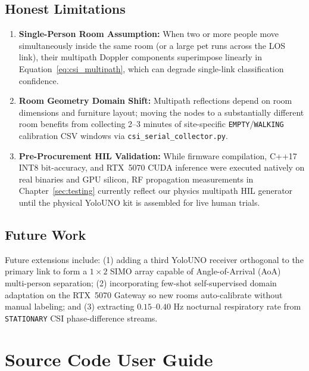 \documentclass{hcmut-report}
\begin{document}
\subsection[Limitations]{Honest Limitations}
\label{sec:limitations}

\begin{enumerate}
  \item \textbf{Single-Person Room Assumption:} When two or more people move simultaneously inside the same room (or a large pet runs across the LOS link), their multipath Doppler components superimpose linearly in Equation~\eqref{eq:csi_multipath}, which can degrade single-link classification confidence.
  \item \textbf{Room Geometry Domain Shift:} Multipath reflections depend on room dimensions and furniture layout; moving the nodes to a substantially different room benefits from collecting 2--3 minutes of site-specific \texttt{EMPTY}/\texttt{WALKING} calibration CSV windows via \texttt{csi\_serial\_collector.py}.
  \item \textbf{Pre-Procurement HIL Validation:} While firmware compilation, C++17 INT8 bit-accuracy, and RTX~5070 CUDA inference were executed natively on real binaries and GPU silicon, RF propagation measurements in Chapter~\ref{sec:testing} currently reflect our physics multipath HIL generator until the physical YoloUNO kit is assembled for live human trials.
\end{enumerate}

\subsection[Future Work]{Future Work}
\label{sec:future_work}

Future extensions include: (1) adding a third YoloUNO receiver orthogonal to the primary link to form a $1\times 2$ SIMO array capable of Angle-of-Arrival (AoA) multi-person separation; (2) incorporating few-shot self-supervised domain adaptation on the RTX~5070 Gateway so new rooms auto-calibrate without manual labeling; and (3) extracting $0.15\text{--}0.40\text{ Hz}$ nocturnal respiratory rate from \texttt{STATIONARY} CSI phase-difference streams.

\section[Source Code User Guide]{Source Code User Guide}
\label{sec:user_guide}
\end{document}
